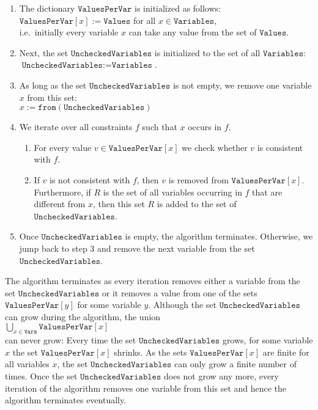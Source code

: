 \begin{enumerate}
\item The dictionary $\texttt{ValuesPerVar}$ is initialized as follows:
      \\[0.2cm]
      \hspace*{1.3cm}
      $\texttt{ValuesPerVar}[x] := \texttt{Values}$ \quad for all $x \in \texttt{Variables}$,
      \\[0.2cm]
      i.e.~initially every variable $x$ can take any value from the set of $\texttt{Values}$.
\item Next, the set $\texttt{UncheckedVariables}$ is initialized to the set of all $\texttt{Variables}$:
      \\[0.2cm]
      \hspace*{1.3cm}
      $\texttt{UncheckedVariables} := \texttt{Variables}$.
\item As long as the set $\texttt{UncheckedVariables}$ is not empty, we remove one variable $x$ from this set:
      \\[0.2cm]
      \hspace*{1.3cm}
      $x := \texttt{from}(\texttt{UncheckedVariables})$
\item We iterate over all constraints $f$ such that $x$ occurs in $f$.  
      \begin{enumerate}
      \item For every value $v \in \texttt{ValuesPerVar}[x]$ we check whether $v$ is consistent with $f$.
      \item If $v$ is not consistent with $f$, then $v$ is removed from $\texttt{ValuesPerVar}[x]$.
            Furthermore, if $R$ is the set of all variables occurring in $f$ that are different from $x$, 
            then this set $R$ is added to the set of $\texttt{UncheckedVariables}$.
      \end{enumerate}
\item Once $\texttt{UncheckedVariables}$ is empty, the algorithm terminates.  Otherwise, we jump back to step 3
      and remove the next variable from the set $\texttt{UncheckedVariables}$.
\end{enumerate}
The algorithm terminates as every iteration removes either a variable from the set
$\texttt{UncheckedVariables}$ or it removes a value from one of the sets $\texttt{ValuesPerVar}[y]$ for some
variable $y$.  Although the set $\texttt{UncheckedVariables}$ can grow during the algorithm,  the union
\\[0.2cm]
\hspace*{1.3cm}
$\bigcup\limits_{x \in \mathtt{Vars}} \texttt{ValuesPerVar}[x]$ 
\\[0.2cm]
can never grow:  Every time the set $\texttt{UncheckedVariables}$ grows,
for some variable $x$ the set $\texttt{ValuesPerVar}[x]$ shrinks.
As the sets $\texttt{ValuesPerVar}[x]$ are finite for all variables $x$, the set
$\texttt{UncheckedVariables}$ can only grow a finite number of times. 
Once the set $\texttt{UncheckedVariables}$ does not grow any more, every iteration of the algorithm removes one
variable from this set and hence the algorithm terminates eventually.

